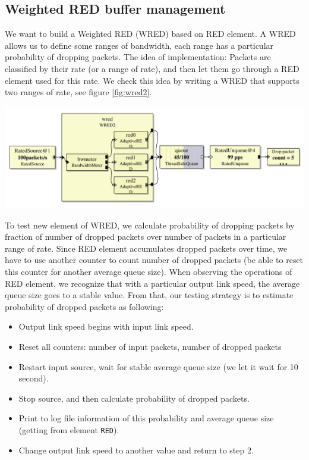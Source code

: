\documentclass[a4paper]{article}
\begin{document}
  \subsection{Weighted RED buffer management}
  We want to build a Weighted RED (WRED) based on RED element. A WRED allows us to define some ranges of bandwidth, each range has a particular probability of dropping packets. The idea of implementation: Packets are classified by their rate (or a range of rate), and then let them go through a RED element used for this rate. We check this idea by writing a WRED that supports two ranges of rate, see figure \ref{fig:wred2}.
    \begin{center}
	  \includegraphics[scale=0.5]{wred2.pdf}
	  \label{fig:wred2}
    \end{center}
  To test new element of WRED, we calculate probability of dropping packets by fraction of number of dropped packets over number of packets in a particular range of rate. Since RED element accumulates dropped packets over time, we have to use another counter to count number of dropped packets (be able to reset this counter for another average queue size). When observing the operations of RED element, we recognize that with a particular output link speed, the average queue size goes to a stable value. From that, our testing strategy is to estimate probability of dropped packets as following:
  \begin{itemize}
  	\item Output link speed begins with input link speed.
  	\item Reset all counters: number of input packets, number of dropped packets
  	\item Restart input source, wait for stable average queue size (we let it wait for 10 second).
  	\item Stop source, and then calculate probability of dropped packets.
  	\item Print to log file information of this probability and average queue size (getting from element \texttt{RED}).
  	\item Change output link speed to another value and return to step 2.
  \end{itemize}
\end{document}

